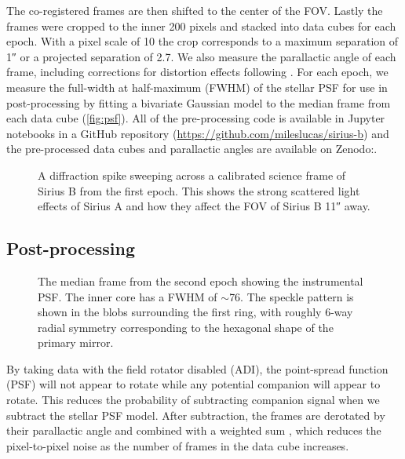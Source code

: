 \documentclass[twocolumn]{aastex631}
\begin{document}
The co-registered frames are then shifted to the center of the FOV. Lastly the frames were cropped to the inner 200 pixels and stacked into data cubes for each epoch. With a pixel scale of \qty{10}{\milliarcsecond} the crop corresponds to a maximum separation of \ang{;;1} or a projected separation of \qty{2.7}{\au}. We also measure the parallactic angle of each frame, including corrections for distortion effects following \citet{yelda_improving_2010}. For each epoch, we measure the full-width at half-maximum (FWHM) of the stellar PSF for use in post-processing by fitting a bivariate Gaussian model to the median frame from each data cube (\autoref{fig:psf}). All of the pre-processing code is available in Jupyter notebooks in a GitHub repository (\href{https://github.com/mileslucas/sirius-b}{https://github.com/mileslucas/sirius-b}) and the pre-processed data cubes and parallactic angles are available on Zenodo:.

\begin{figure}
    \centering
    \caption{A diffraction spike sweeping across a calibrated science frame of Sirius B from the first epoch. This shows the strong scattered light effects of Sirius A and how they affect the FOV of Sirius B \ang{;;11} away.}
    \label{fig:spike}
\end{figure}

\subsection{Post-processing}


\begin{figure}
    \centering
    \caption{The median frame from the second epoch showing the instrumental PSF. The inner core has a FWHM of $\sim$\qty{76}{\milliarcsecond}. The speckle pattern is shown in the blobs surrounding the first ring, with roughly 6-way radial symmetry corresponding to the hexagonal shape of the primary mirror.}
    \label{fig:psf}
\end{figure}

By taking data with the field rotator disabled (ADI), the point-spread function (PSF) will not appear to rotate while any potential companion will appear to rotate. This reduces the probability of subtracting companion signal when we subtract the stellar PSF model. After subtraction, the frames are derotated by their parallactic angle and combined with a weighted sum \citep{bottom_noise-weighted_2017}, which reduces the pixel-to-pixel noise as the number of frames in the data cube increases.
\end{document}
